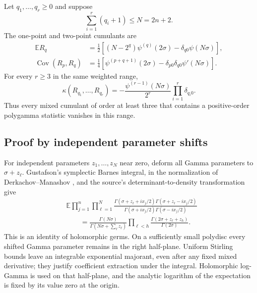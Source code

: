 \begin{theorem}
\label{gc:main}
Let $q_1,\ldots,q_r\ge0$ and suppose
\begin{equation}\label{gc:range}
                   \sum_{i=1}^r(q_i+1)\le N=2n+2.
\end{equation}
The one-point and two-point cumulants are
\begin{align}
 \mathbb E R_q
   &=\frac12\left[(N-2^q)\psi^{(q)}(2\sigma)
               -\delta_{q0}\psi(N\sigma)\right],
              \label{gc:mean}\\
 \operatorname{Cov}(R_p,R_q)
   &=\frac14\left[\psi^{(p+q+1)}(2\sigma)
               -\delta_{p0}\delta_{q0}\psi'(N\sigma)\right].
              \label{gc:cov}
\end{align}
For every $r\ge3$ in the same weighted range,
\begin{equation}\label{gc:higher}
 \boxed{\quad
 \kappa(R_{q_1},\ldots,R_{q_r})
 =-\frac{\psi^{(r-1)}(N\sigma)}{2^r}
                    \prod_{i=1}^r\delta_{q_i0}.
 \quad}
\end{equation}
Thus every mixed cumulant of order at least three that contains a
positive-order polygamma statistic vanishes in this range.
\end{theorem}

\subsection{Proof by independent parameter shifts}

For independent parameters $z_1,\ldots,z_N$ near zero, deform all Gamma
parameters to $\sigma+z_\ell$. Gustafson's symplectic Barnes integral,
in the normalization of Derkachov--Manashov \cite[Eq.~(2)]{DerkachovManashov}, and the
source's determinant-to-density transformation give
\begin{equation}\label{gc:unpaired}
\begin{split}
 &\mathbb E\prod_{j=1}^n\prod_{\ell=1}^N
 \frac{\Gamma(\sigma+z_\ell+ix_j/2)
       \Gamma(\sigma+z_\ell-ix_j/2)}
      {\Gamma(\sigma+ix_j/2)\Gamma(\sigma-ix_j/2)}\\
 &\qquad=
 \frac{\Gamma(N\sigma)}{\Gamma(N\sigma+\sum_\ell z_\ell)}
 \prod_{\ell<h}
       \frac{\Gamma(2\sigma+z_\ell+z_h)}{\Gamma(2\sigma)}.
\end{split}
\end{equation}
This is an identity of holomorphic germs. On a sufficiently small
polydisc every shifted Gamma parameter remains in the right half-plane.
Uniform Stirling bounds leave an integrable exponential majorant, even
after any fixed mixed derivative; they justify coefficient extraction
under the integral. Holomorphic log-Gamma is used on that half-plane,
and the analytic logarithm of the expectation is fixed by its value
zero at the origin.

